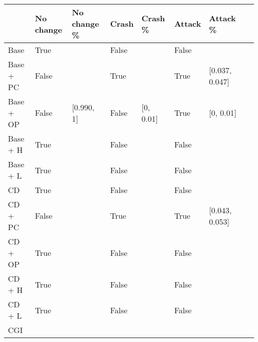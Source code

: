 \begin{table}
    \begin{tabular}{l|l|l|l|l|l|l|l}
    ~         & No change & No change \% & Crash & Crash \% & Attack & Attack \% \\ \hline
    Base      & True &\relax[0.990, 1] & False & \relax[0, 0.01] & False & \relax[0, 0.01] ~                                                                                    & ~ \\
    Base + PC & False & \relax[0.768, 0.778] & True & \relax[0.180, 0.190] & True & [0.037, 0.047]                                                                                   & ~ \\
    Base + OP & False & [0.990, 1] & False & [0, 0.01] & True & [0, 0.01]                                                                                   & ~ \\
    Base + H  & True &\relax[0.990, 1] & False & \relax[0, 0.01] & False & \relax[0, 0.01]                                                                                    & ~ \\
    Base + L  & True &\relax[0.990, 1] & False & \relax[0, 0.01] & False & \relax[0, 0.01]                                                                                    & ~ \\
    CD        & True &\relax[0.990, 1] & False & \relax[0, 0.01] & False & \relax[0, 0.01]                                                                                    & ~ \\
    CD + PC   & False & \relax[0.765, 0.775] & True & \relax[0.177, 0.187] & True & [0.043, 0.053]                                                                                & ~ \\
    CD + OP   & True &\relax[0.990, 1] & False & \relax[0, 0.01] & False & \relax[0, 0.01]                                                                                   & ~ \\
    CD + H    & True &\relax[0.990, 1] & False & \relax[0, 0.01] & False & \relax[0, 0.01]                                                                                    & ~ \\
    CD + L    & True &\relax[0.990, 1] & False & \relax[0, 0.01] & False & \relax[0, 0.01]                                                                                    & ~ \\
    CGI       & ~                                                                                    & ~ \\

\end{tabular}
\end{table}

